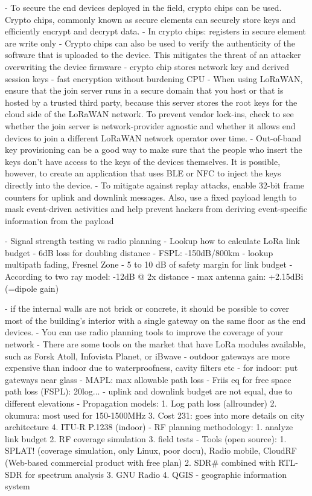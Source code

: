 - To secure the end devices deployed in the field, crypto chips can be used. Crypto chips, commonly known as secure elements 
  can securely store keys and efficiently encrypt and decrypt data.
- In crypto chips: registers in secure element are write only
- Crypto chips can also be used to verify the authenticity of the software that is uploaded to the device. 
  This mitigates the threat of an attacker overwriting the device firmware
- crypto chip stores network key and derived session keys 
- fast encryption without burdening CPU 
- When using LoRaWAN, ensure that the join server runs in a secure domain that you host or that is hosted by a trusted third party, because this server stores the root keys for the cloud 
  side of the LoRaWAN network. To prevent vendor lock-ins, check to see whether the join server is 
  network-provider agnostic and whether it allows end devices to join a different LoRaWAN network operator over time.
- Out-of-band key provisioning can be a good way to make sure that the people who insert the keys don’t have access to the keys of the devices themselves. 
  It is possible, however, to create an application that uses BLE or NFC to inject the keys directly into the device.
- To mitigate against replay attacks, enable 32-bit frame counters for uplink and downlink messages. Also, use a fixed payload length to mask event-driven 
  activities and help prevent hackers from deriving event-specific information from the payload

- Signal strength testing vs radio planning
- Lookup how to calculate LoRa link budget
- 6dB loss for doubling distance
- FSPL: -150dB/800km
- lookup multipath fading, Fresnel Zone
- 5 to 10 dB of safety margin for link budget
- According to two ray model: -12dB @ 2x distance
- max antenna gain: +2.15dBi (=dipole gain)

- if the internal walls are not brick or concrete, it should be possible to cover most of the 
  building’s interior with a single gateway on the same floor as the end devices.
- You can use radio planning tools to improve the coverage of your network
- There are some tools on the market that have LoRa modules available, such as Forsk Atoll, Infovista Planet, or iBwave
- outdoor gateways are more expensive than indoor due to waterproofness, cavity filters etc
- for indoor: put gateways near glass
- MAPL: max allowable path loss
- Friis eq for free space path loss (FSPL): 20log... 
- uplink and downlink budget are not equal, due to different elevations
- Propagation models:
  1. Log path loss (allrounder)
  2. okumura: most used for 150-1500MHz
  3. Cost 231: goes into more details on city architecture
  4. ITU-R P.1238 (indoor)
- RF planning methodology:
  1. analyze link budget 
  2. RF coverage simulation
  3. field tests
- Tools (open source):
  1. SPLAT! (coverage simulation, only Linux, poor docu), Radio mobile, CloudRF (Web-based commercial product with free plan)
  2. SDR# combined with RTL-SDR for spectrum analysis
  3. GNU Radio 
  4. QGIS - geographic information system

